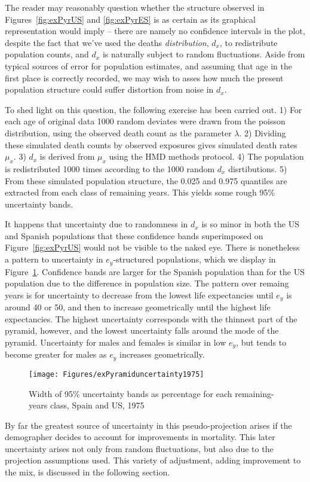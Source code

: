 \FloatBarrier
\label{sec:structuncertainty}
The reader may reasonably question whether the structure observed in
Figures~\ref{fig:exPyrUS} and \ref{fig:exPyrES} is as certain as its graphical
representation would imply -- there are namely no confidence intervals in the
plot, despite the fact that we've used the deaths \textit{distribution}, $d_x$,
to redistribute population counts, and $d_x$ is naturally subject to random
fluctuations. Aside from typical sources of error for population estimates, and
assuming that age in the first place is correctly recorded, we may wish to asses
how much the present population structure could suffer distortion from noise in
$d_x$. 

To shed light on this question, the following exercise has been
carried out. 1) For each age of original data 1000 random deviates were drawn
from the poisson distribution, using the observed death count as the parameter
$\lambda$. 2) Dividing these simulated death counts by observed exposures gives
simulated death rates $\mu_x$. 3) $d_x$ is derived from $\mu_x$ using the HMD
methods protocol. 4) The population is redistributed 1000 times according to the
1000 random $d_x$ disrtibutions. 5) From these simulated population structure,
the 0.025 and 0.975 quantiles are extracted from each class of remaining years.
This yields some rough 95\% uncertainty bands.

It happens that uncertainty due to randomness in $d_x$ is so minor in both the
US and Spanish populations that these confidence bands superimposed on
Figure~\ref{fig:exPyrUS} would not be visible to the naked eye. There is
nonetheless a pattern to uncertainty in $e_y$-structured populations, 
which we display in Figure~\ref{fig:PyramidUncertainty}. Confidence bands are
larger for the Spanish population than for the US population due to
the difference in population size. The pattern over remaing years is for
uncertainty to decrease from the lowest life expectancies until $e_y$ is around 40 or 50, and then to
increase geometrically until the highest life expectancies. The highest
uncertainty corresponds with the thinnest part of the pyramid, however, and the
lowest uncertainty falls around the mode of the pyramid. Uncertainty for males
and females is similar in low $e_y$, but tends to become greater for males as
$e_y$ increases geometrically.

\begin{figure}
      \centering
      \caption{Width of 95\% uncertainty bands as percentage for each
      remaining-years class, Spain and US, 1975}
         \texttt{[image: Figures/exPyramiduncertainty1975]}
      \label{fig:PyramidUncertainty} 
\end{figure}

By far the greatest source of uncertainty in this
pseudo-projection arises if the demographer decides to account for
improvements in mortality. This later uncertainty arises not only from
random fluctuations, but also due to the projection assumptions used. This
variety of adjustment, adding improvement to the mix, is discussed in the
following section.

\FloatBarrier